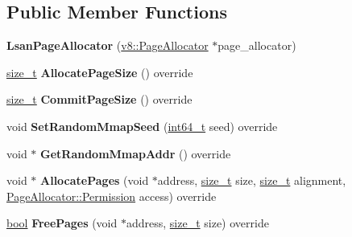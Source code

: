 \subsection*{Public Member Functions}
\begin{DoxyCompactItemize}
\item 
\mbox{\label{classv8_1_1base_1_1LsanPageAllocator_a6a9d1c006434ae1ed5f89bc9883ca12f}} 
{\bfseries Lsan\+Page\+Allocator} (\mbox{\hyperlink{classv8_1_1PageAllocator}{v8\+::\+Page\+Allocator}} $\ast$page\+\_\+allocator)
\item 
\mbox{\label{classv8_1_1base_1_1LsanPageAllocator_a8c3c3a461821c9e80569efad81b39c7b}} 
\mbox{\hyperlink{classsize__t}{size\+\_\+t}} {\bfseries Allocate\+Page\+Size} () override
\item 
\mbox{\label{classv8_1_1base_1_1LsanPageAllocator_a7e5a89ff828eb54a4cd538e77ebf2226}} 
\mbox{\hyperlink{classsize__t}{size\+\_\+t}} {\bfseries Commit\+Page\+Size} () override
\item 
\mbox{\label{classv8_1_1base_1_1LsanPageAllocator_a1aef2aced2520541315dfbb4ad61ba5f}} 
void {\bfseries Set\+Random\+Mmap\+Seed} (\mbox{\hyperlink{classint64__t}{int64\+\_\+t}} seed) override
\item 
\mbox{\label{classv8_1_1base_1_1LsanPageAllocator_a83f8da6e8b55a14d5849b248b13b3166}} 
void $\ast$ {\bfseries Get\+Random\+Mmap\+Addr} () override
\item 
\mbox{\label{classv8_1_1base_1_1LsanPageAllocator_a56a872aa178c1ed257d7c5630f89fa34}} 
void $\ast$ {\bfseries Allocate\+Pages} (void $\ast$address, \mbox{\hyperlink{classsize__t}{size\+\_\+t}} size, \mbox{\hyperlink{classsize__t}{size\+\_\+t}} alignment, \mbox{\hyperlink{classv8_1_1PageAllocator_a88f74b164fe97e053259f67a95758415}{Page\+Allocator\+::\+Permission}} access) override
\item 
\mbox{\label{classv8_1_1base_1_1LsanPageAllocator_a6a624340b363e673ad8cb11fb510d575}} 
\mbox{\hyperlink{classbool}{bool}} {\bfseries Free\+Pages} (void $\ast$address, \mbox{\hyperlink{classsize__t}{size\+\_\+t}} size) override

\end{DoxyCompactItemize}
